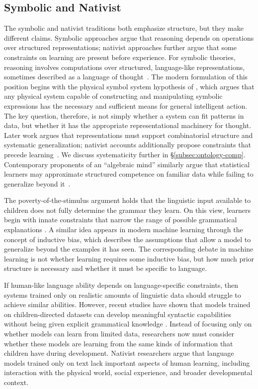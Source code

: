 \documentclass[acmsmall,screen,review,anonymous]{acmart}
\begin{document}
\subsection{Symbolic and Nativist}
\label{subsec:ontology-symbolic}

The symbolic and nativist traditions both emphasize structure, but they make different claims.
%
Symbolic approaches argue that reasoning depends on operations over structured representations; nativist approaches further argue that some constraints on learning are present before experience.
%
For symbolic theories, reasoning involves computations over structured, language-like representations, sometimes described as a language of thought~\citep{fodor1975language}.
%
The modern formulation of this position begins with the physical symbol system hypothesis of \citet{newellsimon1976}, which argues that any physical system capable of constructing and manipulating symbolic expressions has the necessary and sufficient means for general intelligent action.
%
The key question, therefore, is not simply whether a system can fit patterns in data, but whether it has the appropriate representational machinery for thought. 
%
Later work argues that representations must support combinatorial structure and systematic generalization; nativist accounts additionally propose constraints that precede learning~\citep{fodorpylyshyn1988, chomsky1959, marcus2020}.
%
We discuss systematicity further in \S\ref{subsec:ontology-comp}.
%
Contemporary proponents of an ``algebraic mind'' similarly argue that statistical learners may approximate structured competence on familiar data while failing to generalize beyond it~\citep{marcus2019, marcus2020}.
 
The poverty-of-the-stimulus argument holds that the linguistic input available to children does not fully determine the grammar they learn.
%
On this view, learners begin with innate constraints that narrow the range of possible grammatical explanations \citep{aec7bd17-a4c8-3578-b764-35112067fc74}.
%
A similar idea appears in modern machine learning through the concept of inductive bias, which describes the assumptions that allow a model to generalize beyond the examples it has seen.
%
The corresponding debate in machine learning is not whether learning requires some inductive bias, but how much prior structure is necessary and whether it must be specific to language.
 
If human-like language ability depends on language-specific constraints, then systems trained only on realistic amounts of linguistic data should struggle to achieve similar abilities.
%
However, recent studies have shown that models trained on children-directed datasets can develop meaningful syntactic capabilities without being given explicit grammatical knowledge \citep{warstadt2023babylm, huebner-etal-2021-babyberta}. 
%
Instead of focusing only on whether models can learn from limited data, researchers now must consider whether these models are learning from the same kinds of information that children have during development. 
%
Nativist researchers argue that language models trained only on text lack important aspects of human learning, including interaction with the physical world, social experience, and broader developmental context. 
 
\end{document}
